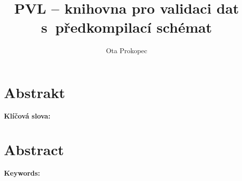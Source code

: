 \documentclass[a4paper]{report}
\title{PVL -- knihovna pro validaci dat s~předkompilací schémat}
\author{Ota Prokopec}
\date{}
\begin{document}
\maketitle
\section*{Abstrakt}


\noindent\textbf{Klíčová slova:} \keywordscs
\section*{Abstract}


\noindent\textbf{Keywords:} \keywordsen


\printbibliography
\end{document}
